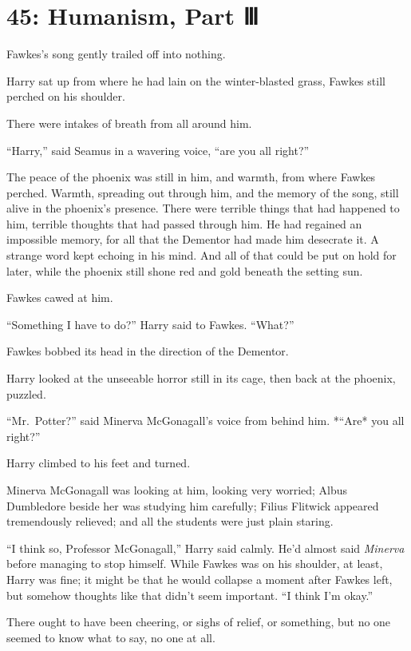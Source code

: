 \chapter{45: Humanism, Part Ⅲ}

Fawkes's song gently trailed off into nothing.

Harry sat up from where he had lain on the winter-blasted grass, Fawkes
still perched on his shoulder.

There were intakes of breath from all around him.

``Harry,'' said Seamus in a wavering voice, ``are you all right?''

The peace of the phoenix was still in him, and warmth, from where Fawkes
perched. Warmth, spreading out through him, and the memory of the song,
still alive in the phoenix's presence. There were terrible things that
had happened to him, terrible thoughts that had passed through him. He
had regained an impossible memory, for all that the Dementor had made
him desecrate it. A strange word kept echoing in his mind. And all of
that could be put on hold for later, while the phoenix still shone red
and gold beneath the setting sun.

Fawkes cawed at him.

``Something I have to do?'' Harry said to Fawkes. ``What?''

Fawkes bobbed its head in the direction of the Dementor.

Harry looked at the unseeable horror still in its cage, then back at the
phoenix, puzzled.

``Mr.~Potter?'' said Minerva McGonagall's voice from behind him. *``Are*
you all right?''

Harry climbed to his feet and turned.

Minerva McGonagall was looking at him, looking very worried; Albus
Dumbledore beside her was studying him carefully; Filius Flitwick
appeared tremendously relieved; and all the students were just plain
staring.

``I think so, Professor McGonagall,'' Harry said calmly. He'd almost
said \emph{Minerva} before managing to stop himself. While Fawkes was on
his shoulder, at least, Harry was fine; it might be that he would
collapse a moment after Fawkes left, but somehow thoughts like that
didn't seem important. ``I think I'm okay.''

There ought to have been cheering, or sighs of relief, or something, but
no one seemed to know what to say, no one at all.

